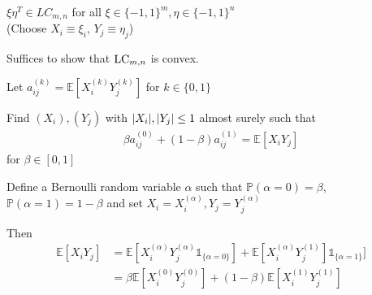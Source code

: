 \begin{frame}
	\begin{exampleblock}
		\begin{itemize}
			 {\item $ \xi \eta^T \in LC_{m,n}  $ for all $\xi \in \{-1,1\}^m, \eta \in \{-1,1\}^n   $   \\
			 	(Choose $ X_i \equiv \xi_i, \, Y_j \equiv \eta_j $)}
			{\item Suffices to show that $ \textup{LC}_{m,n} $ is convex. }
			{\item Let $ a_{ij}^{(k)} = \mathbb{E}[X_i^{(k)}Y_{j}^{(k)}] $ for $ k \in \{0,1\} $}
			{\item Find $ (X_i),(Y_j) $ with $ {\left|{X_i}\right|},{\left|{Y_j}\right|} \le 1 $ almost surely such that
		\begin{align*}
				\beta a_{ij}^{(0)}+ (1-\beta)a_{ij}^{(1)} = \mathbb{E}[X_iY_j]
		\end{align*}
			for $ \beta \in [0,1] $}
		{\item Define a Bernoulli random variable $ \alpha $ such that $ \mathbb{P}(\alpha = 0) = \beta $, $ \mathbb{P}(\alpha = 1) = 1 - \beta$ and set $ X_i = X_i^{(\alpha)}, Y_j = Y_j^{(\alpha)} $}
		{\item Then 
			\begin{align*}
			\mathbb{E}[X_iY_j] &= \mathbb{E}[X_i^{(\alpha)}Y_j^{(\alpha)}  \mathds{1}_{ \{\alpha = 0\}}] + \mathbb{E}[X_i^{(\alpha)}Y_j^{(1)}]\mathds{1}_{\{\alpha = 1\}}] \\
			&= \beta \mathbb{E}[X_i^{(0)}Y_j^{(0)} ] + (1-\beta) \mathbb{E}[X_i^{(1)}Y_j^{(1)}]
			\end{align*}}
		\end{itemize}
	\end{exampleblock}
\end{frame}


